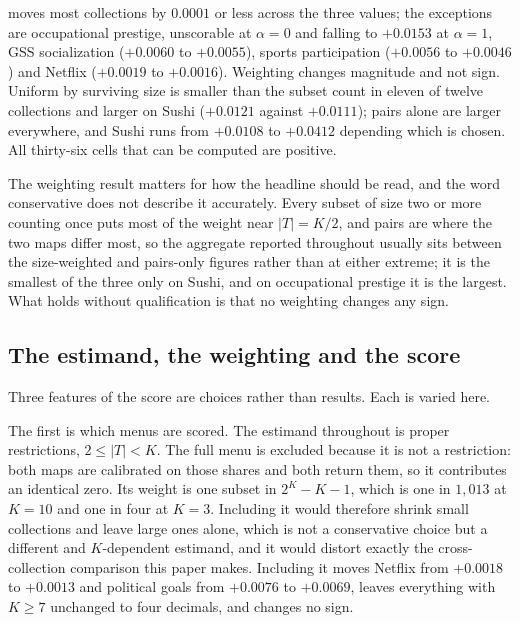 \documentclass[11pt]{article}
\begin{document}
\begin{table}[ht]
{moves most collections by $0.0001$ or less across the three values; the exceptions are
occupational prestige, unscorable at $\alpha = 0$ and falling to $+0.0153$ at $\alpha = 1$,
GSS socialization ($+0.0060$ to $+0.0055$), sports participation ($+0.0056$ to $+0.0046$) and
Netflix ($+0.0019$ to $+0.0016$).
Weighting changes magnitude and not sign. Uniform by surviving size is smaller than the subset
count in eleven of twelve collections and larger on Sushi ($+0.0121$ against $+0.0111$); pairs
alone are larger everywhere, and Sushi runs from $+0.0108$ to $+0.0412$ depending which is
chosen. All thirty-six cells that can be computed are positive.}
\label{tab:conventions}
\end{table}

The weighting result matters for how the headline should be read, and the word conservative
does not describe it accurately. Every subset of size two or more counting once puts most of the
weight near $|T| = K/2$, and pairs are where the two maps differ most, so the aggregate reported
throughout usually sits between the size-weighted and pairs-only figures rather than at either
extreme; it is the smallest of the three only on Sushi, and on occupational prestige it is the
largest. What holds without qualification is that no weighting changes any sign.

\subsection{The estimand, the weighting and the score}
\label{sec:estimand}

Three features of the score are choices rather than results. Each is varied here.

The first is which menus are scored. The estimand throughout is proper restrictions,
$2 \le |T| < K$. The full menu is excluded because it is not a restriction: both maps are
calibrated on those shares and both return them, so it contributes an identical zero. Its weight
is one subset in $2^K - K - 1$, which is one in $1{,}013$ at $K = 10$ and one in four at $K = 3$.
Including it would therefore shrink small collections and leave large ones alone, which is not a
conservative choice but a different and $K$-dependent estimand, and it would distort exactly the
cross-collection comparison this paper makes. Including it moves Netflix from $+0.0018$ to
$+0.0013$ and political goals from $+0.0076$ to $+0.0069$, leaves everything with $K \ge 7$
unchanged to four decimals, and changes no sign.
\end{document}
